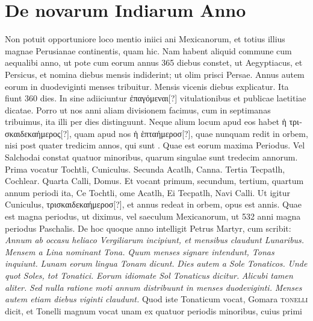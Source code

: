 \section{De novarum Indiarum Anno}
Non potuit opportuniore loco mentio iniici ani Mexicanorum,
et totius illius magnae Perusianae continentis, quam hic.
%
Nam habent aliquid commune cum aequalibi anno, ut pote cum
eorum annus 365 diebus constet, ut Aegyptiacus, et Persicus, et nomina
diebus mensis indiderint; ut olim prisci Persae.
Annus autem
eorum in duodeviginti menses tribuitur.
Mensis vicenis diebus explicatur.
Ita fiunt 360 dies.
In sine adiiciuntur \textgreek{ἐπαγόμεναι}[?] vitulationibus
et publicae laetitiae dicatae.
Porro ut nos anni aliam divisionem
facimus, cum in septimanas tribuimus, ita illi per  dies distinguunt.
Neque alium locum apud eos habet
 \textgreek{ἡ τρισκαιδεκαήμερος}[?], quam
apud nos \textgreek{ἡ ἑπταήμεροσ}[?],
 quae nunquam redit in orbem, nisi post quater
tredicim annos, qui sunt .
Quae est eorum maxima Periodus.
Vel
Salchodai constat quatuor minoribus, quarum singulae sunt tredecim
annorum.
Prima vocatur Tochtli, Cuniculus.
Secunda Acatlh,
Canna.
Tertia Tecpatlh, Cochlear.
Quarta Calli, Domus.
Et vocant
primum, secundum, tertium, quartum annum periodi ita, Ce Tochtli,
ome Acatlh, Ei Tecpatlh, Navi Calli.
Ut igitur Cuniculus,
\textgreek{τρισκαιδεκαήμεροσ}[?], et annus redeat in orbem, opus est 
 annis.
Quae
est magna periodus, ut diximus, vel saeculum Mexicanorum, ut 532
anni magna periodus Paschalis.
De hoc quoque anno intelligit Petrus
Martyr, cum scribit: \textit{Annum ab occasu heliaco Vergiliarum incipiunt,
et mensibus claudunt Lunaribus.}
\textit{Mensem a Lina nominant
Tona.}
\textit{Quum menses signare intendunt, Tonas inquiunt.}
\textit{Lunam
eorum lingua Tonam dicunt.}
\textit{Dies autem a Sole Tonaticos.}
\textit{Unde quot Soles, tot Tonatici.}
\textit{Eorum idiomate Sol Tonaticus dicitur.}
\textit{Alicubi tamen aliter.}
\textit{Sed nulla ratione moti annum distribuunt
in menses duodeviginti.}
\textit{Menses autem etiam diebus viginti claudunt.}
Quod iste Tonaticum vocat, Gomara \textsc{tonelli} dicit, et Tonelli
magnum vocat unam ex quatuor periodis minoribus, cuius primi
